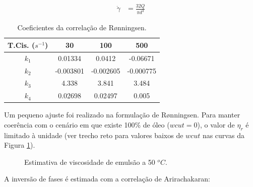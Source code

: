 \documentclass[final,5p]{elsarticle}
\numberwithin{equation}{section}
\begin{document}
        \begin{align}
            \dot{\gamma} &= \frac{32 Q}{\pi d^3}
        \end{align}

        \begin{table}[ht]
            \centering
            \begin{tabular}{c|ccc}
                T.Cis. ($s^{-1}$) & 30 & 100 & 500 \\
                 \hline
                 $k_1$ & 0.01334 & 0.0412 & -0.06671 \\
                 $k_2$ & -0.003801 & -0.002605 & -0.000775 \\
                 $k_3$ & 4.338 & 3.841 & 3.484 \\
                 $k_4$ & 0.02698 & 0.02497 & 0.005 \\
            \end{tabular}
            \caption{Coeficientes da correlação de Rønningsen.}
            \label{tab:ronningsen}
        \end{table}

        Um pequeno ajuste foi realizado na formulação de Rønningsen. Para manter coerência com o cenário em que existe 100\% de óleo ($wcut=0$), o valor de $\eta_r$ é limitado à unidade (ver trecho reto para valores baixos de $wcut$ nas curvas da Figura \ref{fig:emulsao}).

        \begin{figure}[hbt!]
            \caption{Estimativa de viscosidade de emulsão a 50 $^oC$.}
            \label{fig:emulsao}
        \end{figure}

        A inversão de fases é estimada com a correlação de Arirachakaran\cite{10.2118/18836-MS}:
\end{document}
